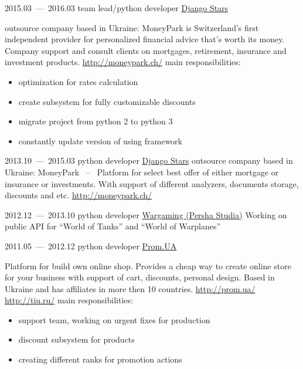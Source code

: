 \documentclass[11pt,a4paper,oneside]{moderncv}
\begin{document}
        \cventry
            {2015.03~---~2016.03}
            {team lead/python developer}
            {\href{http://djangostars.com}{Django Stars}}
            {}{}
            {
              outsource company based in Ukraine:\newline
              MoneyPark is Switzerland's first independent provider for personalized financial advice that's worth its money. Company support and consult clients on mortgages, retirement, insurance and investment products. \url{http://moneypark.ch/}\newline
              main responsibilities:
              \begin{itemize}
                \item optimization for rates calculation
                \item create subsystem for fully customizable discounts
                \item migrate project from python 2 to python 3
                \item constantly update version of using framework
              \end{itemize}
            }

        \cventry
            {2013.10~---~2015.03}
            {python developer}
            {\href{http://djangostars.com}{Django Stars}}
            {}{}
            {
              outsource company based in Ukraine:\newline
              MoneyPark ~--~ Platform for select best offer of either mortgage or insurance or investments. With support of different analyzers, documents storage, discounts and etc. \url{http://moneypark.ch/}
            }

        \cventry
            {2012.12~---~2013.10}
            {python developer}
            {\href{https://wargaming.com/}{Wargaming (Persha Studia)}}
            {}{}
            {
              Working on public API for ``World of Tanks'' and ``World of Warplanes''
            }

        \cventry
            {2011.05~--–~2012.12}
            {python developer}
            {\href{https://prom.ua/}{Prom.UA}}
            {}{}
            {
              Platform for build own online shop. Provides a cheap way to create online store for your business with support of cart, discounts, personal design. Based in Ukraine and has affiliates in more then 10 countries. \url{http://prom.ua/} \url{http://tiu.ru/}\newline
              main responsibilities:
              \begin{itemize}
                \item support team, working on urgent fixes for production
                \item discount subsystem for products
                \item creating different ranks for promotion actions
              \end{itemize}
            }
\end{document}
